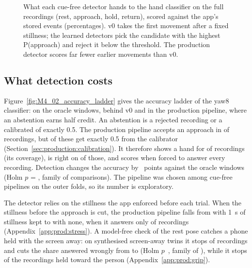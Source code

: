 \begin{figure}[htbp]
\centering
{}
\caption{What each cue-free detector hands to the hand classifier on the  full recordings
(rest, approach, hold, return), scored against the app's stored events (percentages). v0 takes the first movement
after a fixed stillness; the learned detectors pick the candidate with the highest P(approach) and reject it below
the threshold. The production detector scores far fewer earlier movements than v0.}
\label{fig:M4_01_detection_outcomes}
\end{figure}

\subsection{What detection costs}\label{sec:production:ladder}
Figure~\ref{fig:M4_02_accuracy_ladder} gives the accuracy ladder of the yaw8 classifier:  on the
oracle windows,  behind v0 and  in the production pipeline, where an abstention
earns half credit. An abstention is a rejected recording or a calibrated \pright{} of exactly 0.5. The production
pipeline accepts an approach in  of recordings, but  of these
 get exactly 0.5 from the calibrator (Section~\ref{sec:production:calibration}). It therefore
shows a hand for  of recordings (its coverage), is right on
 of those, and scores  when forced to answer every recording.
Detection changes the accuracy by ~points against the oracle windows (Holm $p$ =
, family of  comparisons). The pipeline was chosen among
 cue-free pipelines on the outer folds, so its number is exploratory.

The detector relies on the stillness the app enforced before each trial. When the stillness before the approach is
cut, the production pipeline falls from  with 1~s of stillness kept to
 with none, when it answers only  of recordings
(Appendix~\ref{app:prod:stress}). A model-free check of the rest pose catches a phone held with the screen away:
on synthesised screen-away twins it stops  of recordings and cuts the share
answered wrongly from  to  (Holm $p$~, family
of ), while it stops  of the recordings held toward the person
(Appendix~\ref{app:prod:grip}).

